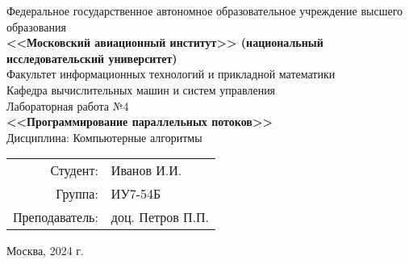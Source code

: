 \begin{titlepage}
    \newpage
    \thispagestyle{empty}
    \begin{center}
        Федеральное государственное автономное образовательное учреждение высшего образования\\[2mm]
        \textbf{<<Московский авиационный институт>> (национальный исследовательский университет)}\\[20mm]
        Факультет информационных технологий и прикладной математики\\[2mm]
        Кафедра вычислительных машин и систем управления\\[30mm]
        {\Large Лабораторная работа №4}\\[3mm]
        {\Large\textbf{<<Программирование параллельных потоков>>}}\\[3mm]
        {\large Дисциплина: Компьютерные алгоритмы}
    \end{center}
    \vfill
    \begin{flushright}
        \begin{tabular}{rl}
            Студент: & Иванов И.И. \\
            Группа: & ИУ7-54Б \\
            Преподаватель: & доц. Петров П.П.
        \end{tabular}
    \end{flushright}
    \vfill
    \begin{center}
        Москва, 2024 г.
    \end{center}
\end{titlepage}
\newpage
